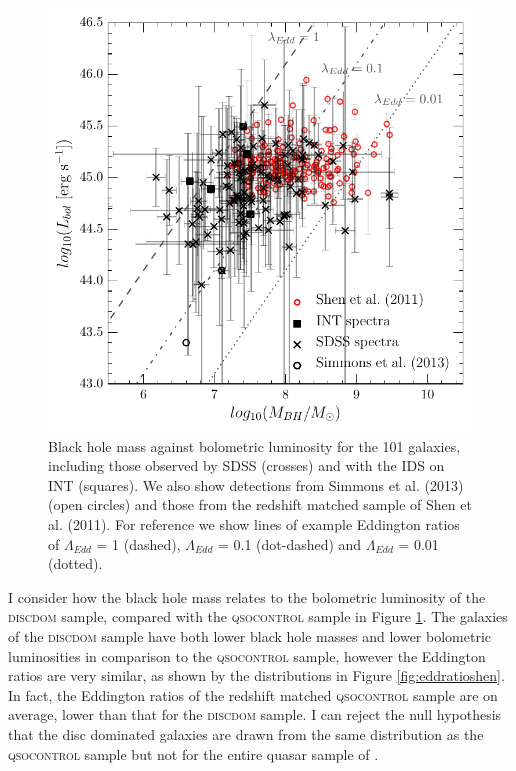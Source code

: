 {\begin{figure}
\centering
\includegraphics[width=\textwidth]{agn/mass_bh_bol_luminosity_with_all_errors_shen_11.pdf}
\caption[Black hole mass against luminosity for the bulgeless AGN sample]{Black hole mass against bolometric luminosity for the 101 galaxies, including those observed by SDSS (crosses) and with the IDS on INT (squares). We also show detections from {\notebsm Simmons et al. (2013)} (open circles) and those from the redshift matched sample of {\notebsm Shen et al. (2011)}. For reference we show lines of example Eddington ratios of $\Lambda_{Edd}$ = 1 (dashed),  $\Lambda_{Edd}$ = 0.1 (dot-dashed) and $\Lambda_{Edd}$ = 0.01 (dotted).
}
\label{fig:mbhvsbol}
\end{figure}


I consider how the black hole mass relates to the bolometric luminosity of the \textsc{discdom} sample, compared with the \textsc{qsocontrol} sample in Figure \ref{fig:mbhvsbol}. The galaxies of the \textsc{discdom} sample have both lower black hole masses and lower bolometric luminosities in comparison to the \textsc{qsocontrol} sample, however the Eddington ratios are very similar, as shown by the distributions in Figure \ref{fig:eddratioshen}. In fact, the Eddington ratios of the redshift matched \textsc{qsocontrol} sample are on average, lower than that for the \textsc{discdom} sample. I can reject the null hypothesis that the disc dominated galaxies are drawn from the same distribution as the \textsc{qsocontrol} sample but not for the entire quasar sample of \citet{shen11}.

}
